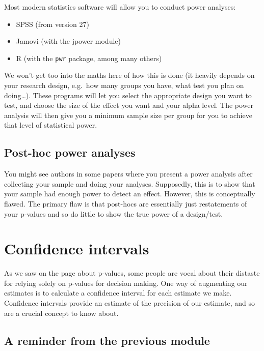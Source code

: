 \documentclass[
]{book}
\providecommand{\tightlist}{%
  \setlength{\itemsep}{0pt}\setlength{\parskip}{0pt}}
\begin{document}
Most modern statistics software will allow you to conduct power analyses:

\begin{itemize}
\tightlist
\item
  SPSS (from version 27)
\item
  Jamovi (with the jpower module)
\item
  R (with the \texttt{pwr} package, among many others)
\end{itemize}

We won't get too into the maths here of how this is done (it heavily depends on your research design, e.g.~how many groups you have, what test you plan on doing\ldots). These programs will let you select the appropriate design you want to test, and choose the size of the effect you want and your alpha level. The power analysis will then give you a minimum sample size per group for you to achieve that level of statistical power.

\subsection{Post-hoc power analyses}\label{post-hoc-power-analyses}

You might see authors in some papers where you present a power analysis after collecting your sample and doing your analyses. Supposedly, this is to show that your sample had enough power to detect an effect. However, this is conceptually flawed. The primary flaw is that post-hocs are essentially just restatements of your p-values and so do little to show the true power of a design/test.

\section{Confidence intervals}\label{confidence-intervals}

As we saw on the page about p-values, some people are vocal about their distaste for relying solely on p-values for decision making. One way of augmenting our estimates is to calculate a confidence interval for each estimate we make. Confidence intervals provide an estimate of the precision of our estimate, and so are a crucial concept to know about.

\subsection{A reminder from the previous module}\label{a-reminder-from-the-previous-module}
\end{document}
